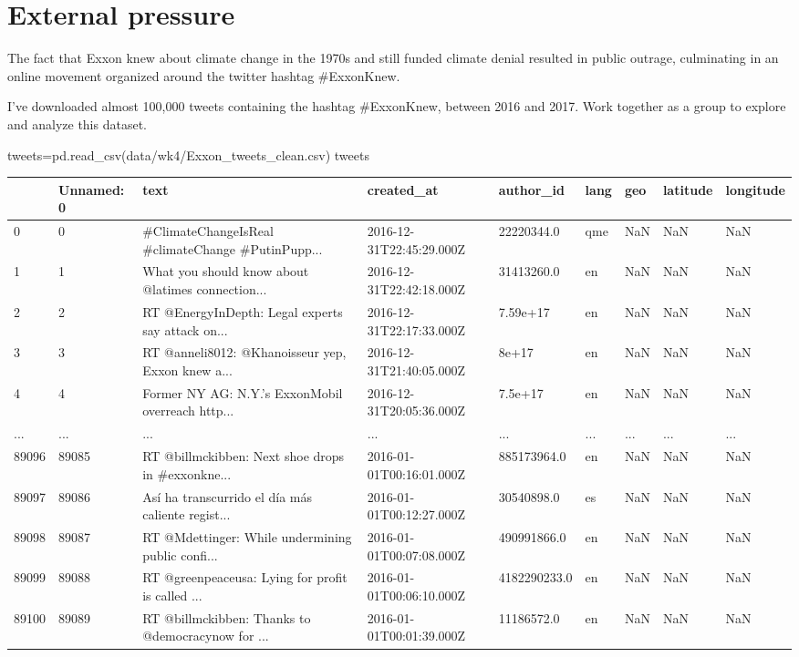 \documentclass[
  letterpaper,
  DIV=11,
  numbers=noendperiod]{scrreprt}
\newenvironment{Shaded}{\begin{snugshade}}{\end{snugshade}}
\newcommand{\NormalTok}[1]{\textcolor[rgb]{0.00,0.23,0.31}{#1}}
\newcommand{\OperatorTok}[1]{\textcolor[rgb]{0.37,0.37,0.37}{#1}}
\newcommand{\StringTok}[1]{\textcolor[rgb]{0.13,0.47,0.30}{#1}}
\begin{document}

\hypertarget{external-pressure}{%
\chapter{External pressure}\label{external-pressure}}

The fact that Exxon knew about climate change in the 1970s and still
funded climate denial resulted in public outrage, culminating in an
online movement organized around the twitter hashtag \#ExxonKnew.

I've downloaded almost 100,000 tweets containing the hashtag
\#ExxonKnew, between 2016 and 2017. Work together as a group to explore
and analyze this dataset.

\begin{Shaded}
\begin{Highlighting}[]
\NormalTok{tweets}\OperatorTok{=}\NormalTok{pd.read\_csv(}\StringTok{\textquotesingle{}data/wk4/Exxon\_tweets\_clean.csv\textquotesingle{}}\NormalTok{)}
\NormalTok{tweets}
\end{Highlighting}
\end{Shaded}

\begin{longtable}[]{@{}lllllllll@{}}
\toprule()
& Unnamed: 0 & text & created\_at & author\_id & lang & geo & latitude &
longitude \\
\midrule()
\endhead
0 & 0 & \#ClimateChangeIsReal \#climateChange \#PutinPupp... &
2016-12-31T22:45:29.000Z & 22220344.0 & qme & NaN & NaN & NaN \\
1 & 1 & What you should know about @latimes connection... &
2016-12-31T22:42:18.000Z & 31413260.0 & en & NaN & NaN & NaN \\
2 & 2 & RT @EnergyInDepth: Legal experts say attack on... &
2016-12-31T22:17:33.000Z & 7.59e+17 & en & NaN & NaN & NaN \\
3 & 3 & RT @anneli8012: @Khanoisseur yep, Exxon knew a... &
2016-12-31T21:40:05.000Z & 8e+17 & en & NaN & NaN & NaN \\
4 & 4 & Former NY AG: N.Y.'s ExxonMobil overreach http... &
2016-12-31T20:05:36.000Z & 7.5e+17 & en & NaN & NaN & NaN \\
... & ... & ... & ... & ... & ... & ... & ... & ... \\
89096 & 89085 & RT @billmckibben: Next shoe drops in \#exxonkne... &
2016-01-01T00:16:01.000Z & 885173964.0 & en & NaN & NaN & NaN \\
89097 & 89086 & Así ha transcurrido el día más caliente regist... &
2016-01-01T00:12:27.000Z & 30540898.0 & es & NaN & NaN & NaN \\
89098 & 89087 & RT @Mdettinger: While undermining public confi... &
2016-01-01T00:07:08.000Z & 490991866.0 & en & NaN & NaN & NaN \\
89099 & 89088 & RT @greenpeaceusa: Lying for profit is called ... &
2016-01-01T00:06:10.000Z & 4182290233.0 & en & NaN & NaN & NaN \\
89100 & 89089 & RT @billmckibben: Thanks to @democracynow for ... &
2016-01-01T00:01:39.000Z & 11186572.0 & en & NaN & NaN & NaN \\
\bottomrule()
\end{longtable}
\end{document}
